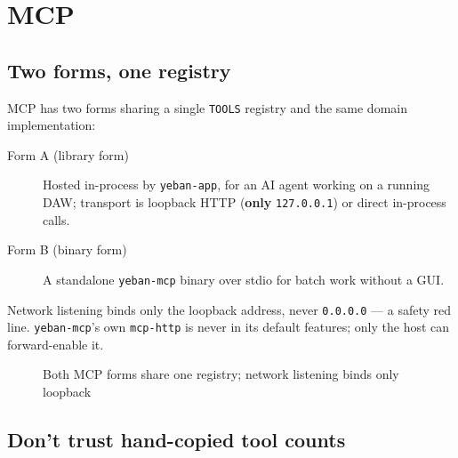 \section{MCP}

\subsection{Two forms, one registry}

MCP has two forms sharing a single \texttt{TOOLS} registry and the same domain
implementation:

\begin{description}
  \item[Form A (library form)] Hosted in-process by \texttt{yeban-app}, for an AI agent working on a running DAW; transport is loopback HTTP (\textbf{only} \texttt{127.0.0.1}) or direct in-process calls.
  \item[Form B (binary form)] A standalone \texttt{yeban-mcp} binary over stdio for batch work without a GUI.
\end{description}

Network listening binds only the loopback address, never \texttt{0.0.0.0} — a safety
red line. \texttt{yeban-mcp}'s own \texttt{mcp-http} is never in its default features;
only the host can forward-enable it.


\begin{figure}[htbp]
\centering
{}
\caption{Both MCP forms share one registry; network listening binds only loopback}
\label{fig:ch10-mcp-forms}
\end{figure}

\subsection{Don't trust hand-copied tool counts}

